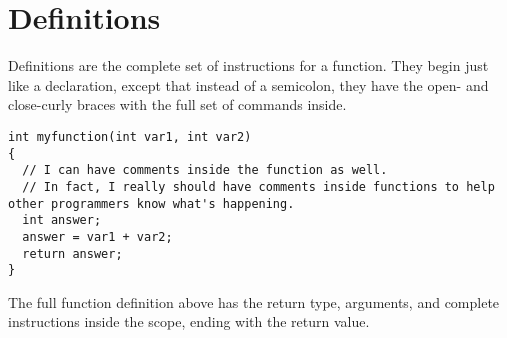 \section{Definitions}
Definitions are the complete set of instructions for a function.  They begin just like a declaration, except that instead of a semicolon, they have the open- and close-curly braces with the full set of commands inside.

\begin{verbatim}
int myfunction(int var1, int var2)
{
  // I can have comments inside the function as well.
  // In fact, I really should have comments inside functions to help other programmers know what's happening.
  int answer;
  answer = var1 + var2;
  return answer;
}
\end{verbatim}

The full function definition above has the return type, arguments, and complete instructions inside the scope, ending with the return value.
